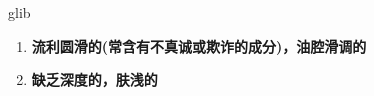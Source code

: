 
\begin{frame}
{\huge glib}
\begin{center}
\begin{enumerate}\Large
  \item \textbf{流利圆滑的(常含有不真诚或欺诈的成分)，油腔滑调的}
  \item \textbf{缺乏深度的，肤浅的}
\end{enumerate}
\end{center}
\end{frame}
